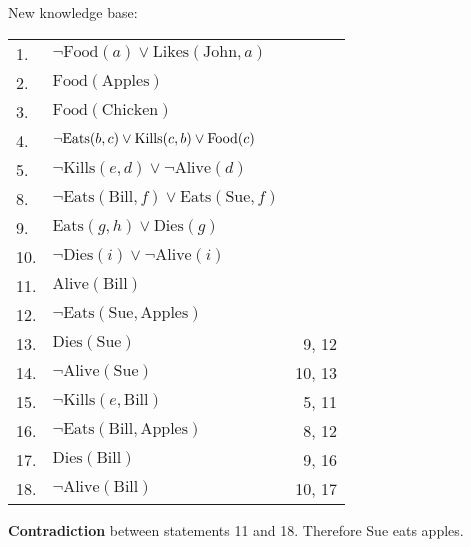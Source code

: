 \documentclass[12pt]{article}
\begin{document}
\begin{enumerate}
\begin{enumerate}
				New knowledge base:

				\begin{tabular}{ l l r }
					1. & $\neg \text{Food}(a) \lor \text{Likes}(\text{John}, a)$ & \\
					2. & $\text{Food}(\text{Apples})$ & \\
					3. & $\text{Food}(\text{Chicken})$ & \\
					4. & $\neg \text{Eats}(b, c) \lor  \text{\text{Kills}}(c, b) \lor \text{Food}(c)$ & \\
					5. & $\neg \text{Kills}(e, d) \lor \neg \text{Alive}(d)$ & \\
					8. & $\neg \text{Eats}(\text{Bill}, f) \lor \text{Eats}(\text{Sue}, f)$ & \\
					9. & $\text{Eats}(g, h) \lor \text{Dies}(g)$ & \\
					10. & $\neg \text{Dies}(i) \lor \neg \text{Alive}(i)$ & \\
					11. & $\text{Alive}(\text{Bill})$ & \\				
					12. & $\neg \text{Eats}(\text{Sue}, \text{Apples})$ & \\
					\toprule
					13. & $\text{Dies}(\text{Sue})$ & 9, 12 \\
					14. & $\neg \text{Alive}(\text{Sue})$ & 10, 13 \\
					15. & $\neg \text{Kills}(e, \text{Bill})$ & 5, 11 \\
					16. & $\neg \text{Eats}(\text{Bill}, \text{Apples})$ & 8, 12 \\
					17. & $\text{Dies}(\text{Bill})$ & 9, 16 \\
					18. & $\neg \text{Alive}(\text{Bill})$ & 10, 17 \\
				\end{tabular}

				\textbf{Contradiction} between statements 11 and 18. Therefore Sue eats apples.
		\end{enumerate}
\end{enumerate}
\end{document}
